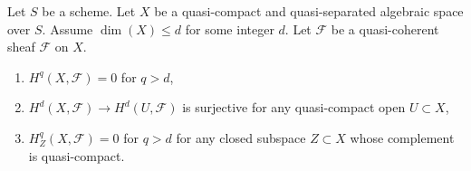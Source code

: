 \begin{lemma}
\label{lemma-vanishing-above-dimension}
Let $S$ be a scheme. Let $X$ be a quasi-compact and quasi-separated
algebraic space over $S$. Assume $\dim(X) \leq d$ for some integer $d$.
Let $\mathcal{F}$ be a quasi-coherent sheaf $\mathcal{F}$ on $X$.
\begin{enumerate}
\item $H^q(X, \mathcal{F}) = 0$ for $q > d$,
\item $H^d(X, \mathcal{F}) \to H^d(U, \mathcal{F})$ is surjective
for any quasi-compact open $U \subset X$,
\item $H^q_Z(X, \mathcal{F}) = 0$ for $q > d$ for any closed subspace
$Z \subset X$ whose complement is quasi-compact.
\end{enumerate}
\end{lemma}

